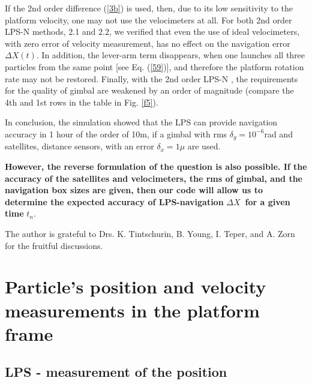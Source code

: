 \documentclass[twocolumn,showpacs,preprintnumbers]{revtex4}
\begin{document}
If the 2nd order difference (\ref{3b}) is used, then, due to its low
sensitivity to the platform velocity, one may not use the velocimeters at
all. For both 2nd order LPS-N methods, 2.1 and 2.2, we verified that even
the use of ideal velocimeters, with zero error of velocity measurement, has
no effect on the navigation error $\Delta X\left( t\right) $. In addition,
the lever-arm term disappears, when one launches all three particles from
the same point [see Eq. (\ref{59})], and therefore the platform rotation
rate may not be restored. Finally, with the 2nd order LPS-N , the
requirements for the quality of gimbal are weakened by an order of magnitude
(compare the 4th and 1st rows in the table in Fig. \ref{f5}).

In conclusion, the simulation showed that the LPS can provide navigation
accuracy in 1 hour of the order of 10m, if a gimbal with rms $\delta
_{g}=10^{-6}$rad and satellites, distance sensors, with an error $\delta
_{x}=1\mu $ are used.

\textbf{However, the reverse formulation of the question is also possible.
If the accuracy of the satellites and velocimeters, the rms of gimbal, and
the navigation box sizes are given, then our code will allow us to determine
the expected accuracy of LPS-navigation }$\Delta X$\textbf{\ for a given
time }$t_{n}.$

\acknowledgments The author is grateful to Drs. K. Tintschurin, B. Young, I.
Teper, and A. Zorn for the fruitful discussions.

\appendix

\section{\label{A1}Particle's position and velocity measurements in the
platform frame}

\subsection{\label{A1.1}LPS - measurement of the position}
\end{document}

